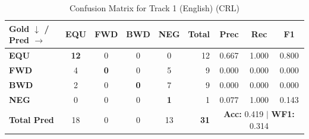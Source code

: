 \begin{table}[ht]
\centering
\small
\begin{tabular}{l|cccc|r|ccc}
\toprule
\textbf{Gold $\downarrow$ / Pred $\rightarrow$} & \textbf{EQU} & \textbf{FWD} & \textbf{BWD} & \textbf{NEG} & \textbf{Total} & \textbf{Prec} & \textbf{Rec} & \textbf{F1} \\
\midrule
\textbf{EQU} & \textbf{12} & 0 & 0 & 0 & 12 & 0.667 & 1.000 & 0.800 \\
\textbf{FWD} & 4 & \textbf{0} & 0 & 5 & 9 & 0.000 & 0.000 & 0.000 \\
\textbf{BWD} & 2 & 0 & \textbf{0} & 7 & 9 & 0.000 & 0.000 & 0.000 \\
\textbf{NEG} & 0 & 0 & 0 & \textbf{1} & 1 & 0.077 & 1.000 & 0.143 \\
\midrule
\textbf{Total Pred} & 18 & 0 & 0 & 13 & \textbf{31} & \multicolumn{3}{c}{\textbf{Acc:} 0.419 $\mid$ \textbf{WF1:} 0.314} \\
\bottomrule
\end{tabular}
\caption{Confusion Matrix for Track 1 (English) (CRL)}
\label{tab:confusion_matrix}
\end{table}